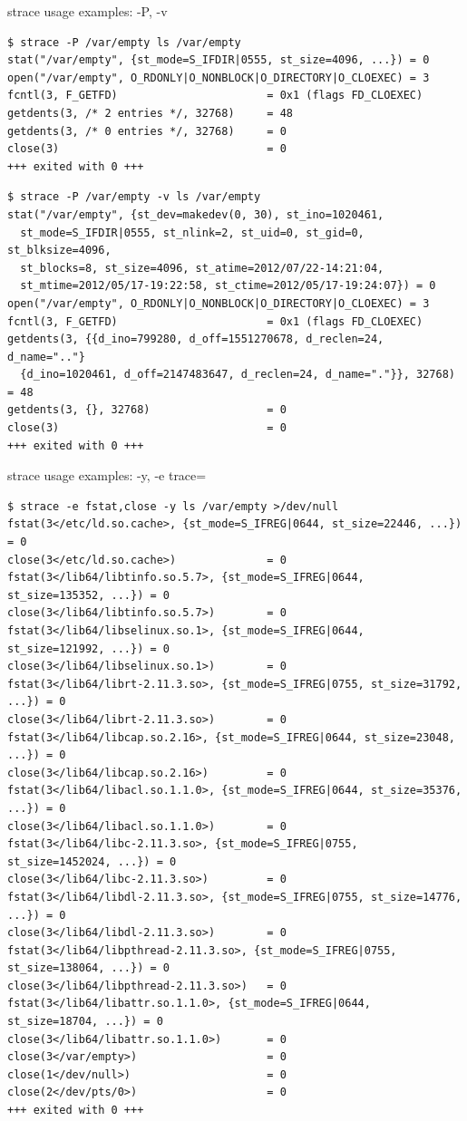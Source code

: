 \documentclass[unicode]{beamer}
\begin{document}
\begin{frame}[fragile]{strace usage examples: -P, -v}
\scriptsize
\begin{verbatim}
$ strace -P /var/empty ls /var/empty
stat("/var/empty", {st_mode=S_IFDIR|0555, st_size=4096, ...}) = 0
open("/var/empty", O_RDONLY|O_NONBLOCK|O_DIRECTORY|O_CLOEXEC) = 3
fcntl(3, F_GETFD)                       = 0x1 (flags FD_CLOEXEC)
getdents(3, /* 2 entries */, 32768)     = 48
getdents(3, /* 0 entries */, 32768)     = 0
close(3)                                = 0
+++ exited with 0 +++
\end{verbatim}

\begin{verbatim}
$ strace -P /var/empty -v ls /var/empty
stat("/var/empty", {st_dev=makedev(0, 30), st_ino=1020461,
  st_mode=S_IFDIR|0555, st_nlink=2, st_uid=0, st_gid=0, st_blksize=4096,
  st_blocks=8, st_size=4096, st_atime=2012/07/22-14:21:04,
  st_mtime=2012/05/17-19:22:58, st_ctime=2012/05/17-19:24:07}) = 0
open("/var/empty", O_RDONLY|O_NONBLOCK|O_DIRECTORY|O_CLOEXEC) = 3
fcntl(3, F_GETFD)                       = 0x1 (flags FD_CLOEXEC)
getdents(3, {{d_ino=799280, d_off=1551270678, d_reclen=24, d_name=".."}
  {d_ino=1020461, d_off=2147483647, d_reclen=24, d_name="."}}, 32768) = 48
getdents(3, {}, 32768)                  = 0
close(3)                                = 0
+++ exited with 0 +++
\end{verbatim}
\end{frame}

\begin{frame}[fragile]{strace usage examples: -y, -e trace=}
\tiny
\begin{verbatim}
$ strace -e fstat,close -y ls /var/empty >/dev/null
fstat(3</etc/ld.so.cache>, {st_mode=S_IFREG|0644, st_size=22446, ...}) = 0
close(3</etc/ld.so.cache>)              = 0
fstat(3</lib64/libtinfo.so.5.7>, {st_mode=S_IFREG|0644, st_size=135352, ...}) = 0
close(3</lib64/libtinfo.so.5.7>)        = 0
fstat(3</lib64/libselinux.so.1>, {st_mode=S_IFREG|0644, st_size=121992, ...}) = 0
close(3</lib64/libselinux.so.1>)        = 0
fstat(3</lib64/librt-2.11.3.so>, {st_mode=S_IFREG|0755, st_size=31792, ...}) = 0
close(3</lib64/librt-2.11.3.so>)        = 0
fstat(3</lib64/libcap.so.2.16>, {st_mode=S_IFREG|0644, st_size=23048, ...}) = 0
close(3</lib64/libcap.so.2.16>)         = 0
fstat(3</lib64/libacl.so.1.1.0>, {st_mode=S_IFREG|0644, st_size=35376, ...}) = 0
close(3</lib64/libacl.so.1.1.0>)        = 0
fstat(3</lib64/libc-2.11.3.so>, {st_mode=S_IFREG|0755, st_size=1452024, ...}) = 0
close(3</lib64/libc-2.11.3.so>)         = 0
fstat(3</lib64/libdl-2.11.3.so>, {st_mode=S_IFREG|0755, st_size=14776, ...}) = 0
close(3</lib64/libdl-2.11.3.so>)        = 0
fstat(3</lib64/libpthread-2.11.3.so>, {st_mode=S_IFREG|0755, st_size=138064, ...}) = 0
close(3</lib64/libpthread-2.11.3.so>)   = 0
fstat(3</lib64/libattr.so.1.1.0>, {st_mode=S_IFREG|0644, st_size=18704, ...}) = 0
close(3</lib64/libattr.so.1.1.0>)       = 0
close(3</var/empty>)                    = 0
close(1</dev/null>)                     = 0
close(2</dev/pts/0>)                    = 0
+++ exited with 0 +++
\end{verbatim}
\end{frame}
\end{document}
